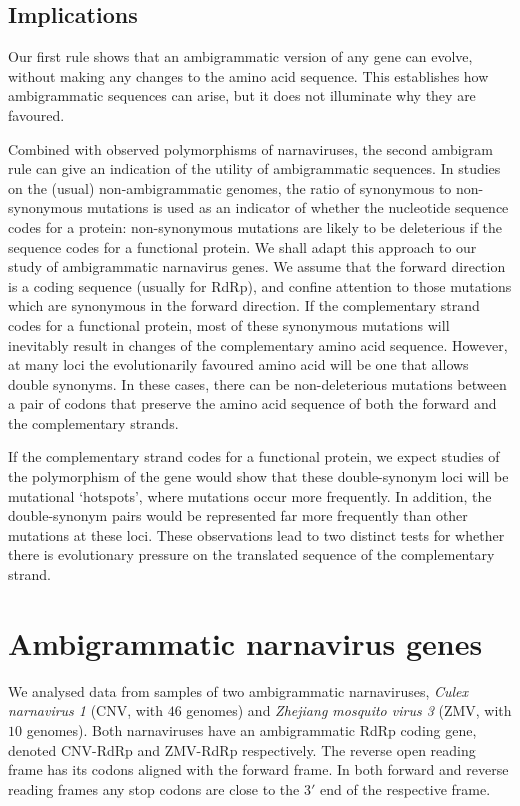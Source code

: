 \documentclass[unnumsec,webpdf,contemporary,large,namedate]{oup-authoring-template}%
\theoremstyle{thmstyleone}%
\theoremstyle{thmstyletwo}%
\theoremstyle{thmstylethree}%
\begin{document}
\subsection{Implications}
\label{sec: 2.3}

Our first rule shows that an ambigrammatic version of any gene can evolve, without
making any changes to the amino acid sequence. This establishes how ambigrammatic sequences
can arise, but it does not illuminate why they are favoured.

Combined with observed polymorphisms of narnaviruses, the second ambigram rule can give an
indication of the utility of ambigrammatic sequences. In studies on the (usual) non-ambigrammatic
genomes, the ratio of synonymous to non-synonymous mutations is used as an indicator of
whether the nucleotide sequence codes for a protein: non-synonymous mutations
are likely to be deleterious if the sequence codes for a functional protein.
We shall adapt this approach to our study of ambigrammatic narnavirus genes.
We assume that the forward direction is a coding sequence (usually for RdRp),
and confine attention to those mutations which are synonymous in the forward
direction. If the complementary strand codes for a functional protein, most of these
synonymous mutations will inevitably result in changes of the complementary
amino acid sequence. However, at many loci the evolutionarily favoured amino acid
will be one that allows double synonyms. In these cases, there can be
non-deleterious mutations between a pair of codons that preserve the amino acid
sequence of both the forward and the
complementary strands.

If the complementary strand codes for a functional protein, we expect studies of the
polymorphism of the gene would show that these double-synonym loci will be
mutational \lq hotspots', where mutations occur more frequently. In addition, the double-synonym pairs
would be represented far more frequently than other mutations at these loci. These observations
lead to two distinct tests for whether there is evolutionary pressure on the translated sequence of the
complementary strand.

\section{Ambigrammatic narnavirus genes}
\label{sec: 3}

We analysed data from samples of two ambigrammatic narnaviruses,
\emph{Culex narnavirus 1} (CNV, with $46$ genomes) and \emph{Zhejiang mosquito virus 3} (ZMV, with
$10$ genomes). Both narnaviruses have an ambigrammatic RdRp coding gene, denoted CNV-RdRp and
ZMV-RdRp respectively. The reverse open reading frame has its codons aligned with the forward frame.
In both forward and reverse reading frames any stop codons are close to the  $3'$ end of the
respective frame.
\end{document}
